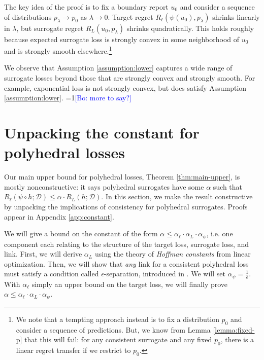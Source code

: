 \documentclass{article}
\theoremstyle{definition}\newtheorem{definition}{Definition}
\theoremstyle{definition}\newtheorem{assumption}{Assumption}
\newcommand{\Comments}{1}
\newcommand{\mynote}[2]{\ifnum\Comments=1\textcolor{#1}{#2}\fi}
\newcommand{\bo}[1]{\mynote{blue}{[Bo: #1]}}
\newcommand{\D}{\mathcal{D}}
\begin{document}
The key idea of the proof is to fix a boundary report $u_0$ and consider a sequence of distributions $p_{\lambda} \to p_0$ as $\lambda \to 0$.
Target regret $R_{\ell}(\psi(u_0),p_{\lambda})$ shrinks linearly in $\lambda$, but surrogate regret $R_L(u_0,p_{\lambda})$ shrinks quadratically.
This holds roughly because expected surrogate loss is strongly convex in some neighborhood of $u_0$ and is strongly smooth elsewhere.\footnote{We note that a tempting approach instead is to fix a distribution $p_0$ and consider a sequence of predictions. But, we know from Lemma \ref{lemma:fixed-p} that this will fail: for any consistent surrogate and any fixed $p_0$, there is a linear regret transfer if we restrict to $p_0$.}

We observe that Assumption \ref{assumption:lower} captures a wide range of surrogate losses beyond those that are strongly convex and strongly smooth.
For example, exponential loss is not strongly convex, but does satisfy Assumption \ref{assumption:lower}. \bo{more to say?}

\section{Unpacking the constant for polyhedral losses} \label{sec:constant}

Our main upper bound for polyhedral losses, Theorem \ref{thm:main-upper}, is mostly nonconstructive: it says polyhedral surrogates have some $\alpha$ such that $R_{\ell}(\psi \circ h; \D) \leq \alpha \cdot R_L(h;\D)$.
In this section, we make the result constructive by unpacking the implications of consistency for polyhedral surrogates.
Proofs appear in Appendix \ref{app:constant}.

We will give a bound on the constant of the form $\alpha \leq \alpha_{\ell} \cdot \alpha_L \cdot \alpha_{\psi}$, i.e. one component each relating to the structure of the target loss, surrogate loss, and link.
First, we will derive $\alpha_L$ using the theory of \emph{Hoffman constants} from linear optimization.
Then, we will show that \emph{any} link for a consistent polyhedral loss must satisfy a condition called $\epsilon$-separation, introduced in \cite{finocchiaro2019embedding}.
We will set $\alpha_{\psi} = \frac{1}{\epsilon}$.
With $\alpha_{\ell}$ simply an upper bound on the target loss, we will finally prove $\alpha \leq \alpha_{\ell} \cdot \alpha_L \cdot \alpha_{\psi}$.
\end{document}
